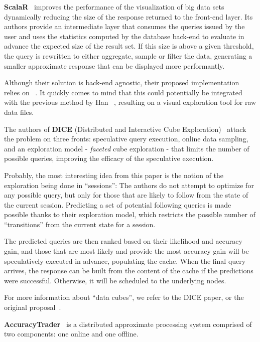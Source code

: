 \medskip

\textbf{ScalaR}~\cite{Battle2013} improves the performance of the visualization 
of big data sets dynamically reducing the size of the response returned to the 
front-end layer. Its authors provide an intermediate layer that consumes the 
queries issued by the user and uses the statistics computed by the database 
back-end to evaluate in advance the expected size of the result set. If this 
size is above a given threshold, the query is rewritten to either aggregate, 
sample or filter the data, generating a smaller approximate response that can be 
displayed more performantly.

Although their solution is back-end agnostic, their proposed implementation 
relies on \scidb~\cite{Stonebraker2011}. It quickly comes to mind that this could 
potentially be integrated with the previous method by Han \etal~\cite{Han2017}, 
resulting on a visual exploration tool for raw data files.

\medskip

The authors of \textbf{DICE} (Distributed and Interactive Cube 
Exploration)~\cite{Kamat2014} attack the problem on three fronts: speculative 
query execution, online data sampling, and an exploration model - 
\textit{faceted} cube exploration - that limits the number of possible queries, 
improving the efficacy of the speculative execution.

Probably, the most interesting idea from this paper is the notion of 
the exploration being done in ``sessions'': The authors do not attempt to 
optimize for any possible query, but only for those that are likely to follow 
from the state of the current session. Predicting a set of potential following 
queries is made possible thanks to their exploration model, which
restricts the possible number of ``transitions'' from the current state 
for a session.

The predicted queries are then ranked based on their likelihood and 
accuracy gain, and those that are most likely and provide the most accuracy gain 
will be speculatively executed in advance, populating the cache. When the final 
query arrives, the response can be built from the content of the cache if the 
predictions were successful. Otherwise, it will be scheduled to the underlying 
nodes.

For more information about ``data cubes'', we refer to the DICE paper,
or the original proposal~\cite{Gray1997}.

\medskip

\textbf{AccuracyTrader}~\cite{Han2016} is a distributed approximate processing 
system comprised of two components: one online and one offline.

